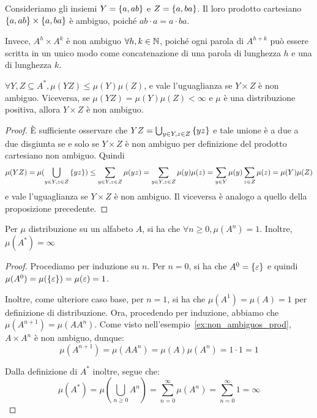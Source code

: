 \begin{example}[label=ex:non_ambiguos_prod]{}
  Consideriamo gli insiemi \(Y = \set{a,ab}\) e \(Z = \set{a,ba}\).
  Il loro prodotto cartesiano \(\set{a,ab}\times\set{a,ba}\) è ambiguo, poiché \(ab\cdot a = a\cdot ba\).

  Invece, \(A^h\times A^k\) è non ambiguo \(\forall h,k \in \mathbb{N}\), poiché ogni parola di \(A^{h+k}\) può essere scritta in un unico modo come concatenazione di una parola di lunghezza \(h\) e una di lunghezza \(k\).
\end{example}
\begin{proposition}[label=prop:distribution_distributivity_over_product]{}
  \(\forall Y,Z \subseteq A^*, \mu(YZ) \leq \mu(Y)\mu(Z)\), e vale l'uguaglianza se \(Y\times Z\) è non ambiguo.
  Viceversa, se \(\mu(YZ) = \mu(Y)\mu(Z) < \infty\) e \(\mu\) è una distribuzione positiva, allora \(Y\times Z\) è non ambiguo.
\end{proposition}
\begin{proof}
  È sufficiente osservare che \(YZ = \bigcup_{y\in Y, z \in Z}\set{yz}\) e tale unione è a due a due disgiunta se e solo se \(Y\times Z\) è non ambiguo per definizione del prodotto cartesiano non ambiguo.
  Quindi
  \[\mu(YZ) = \mu(\bigcup_{y\in Y, z \in Z}\set{yz}) \leq \sum_{y\in Y, z \in Z}\mu(yz) = \sum_{y\in Y, z \in Z}\mu(y)\mu(z) =\sum_{y \in Y}\mu(y) \sum_{z \in Z}\mu(z) = \mu(Y)\mu(Z)\]
  e vale l'uguaglianza se \(Y\times Z\) è non ambiguo.
  Il viceversa è analogo a quello della proposizione precedente.
\end{proof}

\begin{proposition}[label=prop:A_power_mesure_1]{}
  Per \(\mu\) distribuzione su un alfabeto \(A\), si ha che \(\forall n \geq 0, \mu(A^n) = 1\).
  Inoltre, \(\mu(A^*) = \infty\)
\end{proposition}
\begin{proof}
  Procediamo per induzione su \(n\).
  Per \(n=0\), si ha che \(A^0 = \set{\varepsilon}\) e quindi \(\mu(A^0) = \mu(\set{\varepsilon}) = \mu(\varepsilon) = 1\).

  Inoltre, come ulteriore caso base, per \(n=1\), si ha che \(\mu(A^1) = \mu(A) = 1\) per definizione di distribuzione.
  Ora, procedendo per induzione, abbiamo che \(\mu(A^{n+1}) = \mu(AA^n)\).
  Come visto nell'esempio~\ref{ex:non_ambiguos_prod}, \(A \times A^n\) è non ambiguo, dunque:
  \[\mu(A^{n+1}) = \mu(AA^n) = \mu(A)\mu(A^n) = 1 \cdot 1 = 1 \]

  Dalla definizione di \(A^*\) inoltre, segue che:
  \[\mu(A^*) = \mu(\bigcup_{n\geq0} A^n) = \sum_{n=0}^{\infty} \mu(A^n) = \sum_{n=0}^{\infty} 1 = \infty\]
\end{proof}

